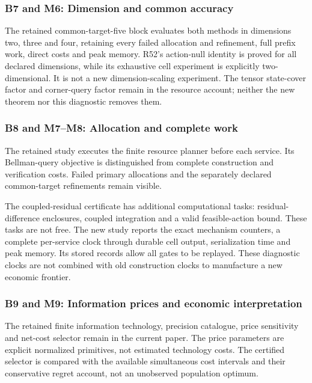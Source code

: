 \hypertarget{b7-and-m6-dimension-and-common-accuracy}{%
\subsubsection{B7 and M6: Dimension and common
accuracy}\label{b7-and-m6-dimension-and-common-accuracy}}

The retained common-target-five block evaluates both methods in
dimensions two, three and four, retaining every failed allocation and
refinement, full prefix work, direct costs and peak memory. R52's
action-null identity is proved for all declared dimensions, while its
exhaustive cell experiment is explicitly two-dimensional. It is not a
new dimension-scaling experiment. The tensor state-cover factor and
corner-query factor remain in the resource account; neither the new
theorem nor this diagnostic removes them.

\hypertarget{b8-and-m7m8-allocation-and-complete-work}{%
\subsubsection{B8 and M7--M8: Allocation and complete
work}\label{b8-and-m7m8-allocation-and-complete-work}}

The retained study executes the finite resource planner before each
service. Its Bellman-query objective is distinguished from complete
construction and verification costs. Failed primary allocations and the
separately declared common-target refinements remain visible.

The coupled-residual certificate has additional computational tasks:
residual-difference enclosures, coupled integration and a valid
feasible-action bound. These tasks are not free. The new study reports
the exact mechanism counters, a complete per-service clock through
durable cell output, serialization time and peak memory. Its stored
records allow all gates to be replayed. These diagnostic clocks are not
combined with old construction clocks to manufacture a new economic
frontier.

\hypertarget{b9-and-m9-information-prices-and-economic-interpretation}{%
\subsubsection{B9 and M9: Information prices and economic
interpretation}\label{b9-and-m9-information-prices-and-economic-interpretation}}

The retained finite information technology, precision catalogue, price
sensitivity and net-cost selector remain in the current paper. The price
parameters are explicit normalized primitives, not estimated technology
costs. The certified selector is compared with the available
simultaneous cost intervals and their conservative regret account, not
an unobserved population optimum.

